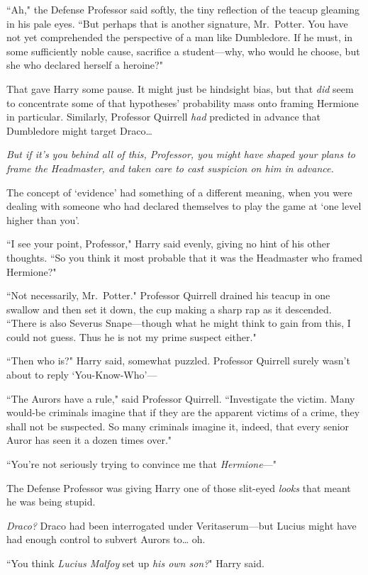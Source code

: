 ``Ah," the Defense Professor said softly, the tiny reflection of the teacup gleaming in his pale eyes. ``But perhaps that is another signature, Mr.~Potter. You have not yet comprehended the perspective of a man like Dumbledore. If he must, in some sufficiently noble cause, sacrifice a student—why, who would he choose, but she who declared herself a heroine?"

That gave Harry some pause. It might just be hindsight bias, but that \emph{did} seem to concentrate some of that hypotheses' probability mass onto framing Hermione in particular. Similarly, Professor Quirrell \emph{had} predicted in advance that Dumbledore might target Draco{\ldots}

\emph{But if it's you behind all of this, Professor, you might have shaped your plans to frame the Headmaster, and taken care to cast suspicion on him in advance.}

The concept of `evidence' had something of a different meaning, when you were dealing with someone who had declared themselves to play the game at `one level higher than you'.

``I see your point, Professor," Harry said evenly, giving no hint of his other thoughts. ``So you think it most probable that it was the Headmaster who framed Hermione?"

``Not necessarily, Mr.~Potter." Professor Quirrell drained his teacup in one swallow and then set it down, the cup making a sharp rap as it descended. ``There is also Severus Snape—though what he might think to gain from this, I could not guess. Thus he is not my prime suspect either."

``Then who is?" Harry said, somewhat puzzled. Professor Quirrell surely wasn't about to reply `You-Know-Who'—

``The Aurors have a rule," said Professor Quirrell. ``Investigate the victim. Many would-be criminals imagine that if they are the apparent victims of a crime, they shall not be suspected. So many criminals imagine it, indeed, that every senior Auror has seen it a dozen times over."

``You're not seriously trying to convince me that \emph{Hermione}—"

The Defense Professor was giving Harry one of those slit-eyed \emph{looks} that meant he was being stupid.

\emph{Draco?} Draco had been interrogated under Veritaserum—but Lucius might have had enough control to subvert Aurors to{\ldots} oh.

``You think \emph{Lucius Malfoy} set up \emph{his own son?}" Harry said.

